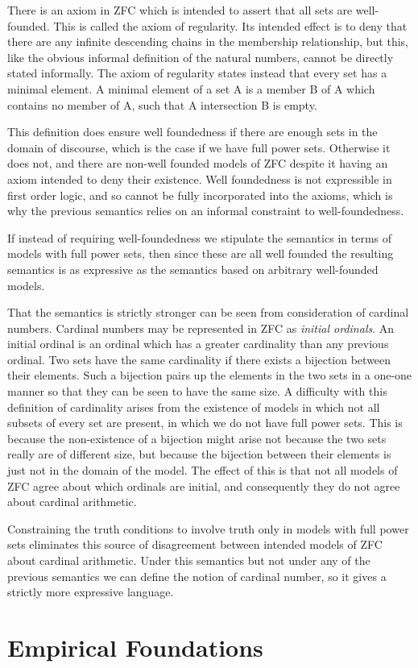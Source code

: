 There is an axiom in ZFC which is intended to assert that all sets are
well-founded.
This is called the axiom of regularity.
Its intended effect is to deny that there are any infinite descending
chains in the membership relationship, but this, like the obvious informal
definition of the natural numbers, cannot be directly stated
informally.
The axiom of regularity states instead that every set has a minimal
element.
A minimal element of a set A is a member B of A which contains no member of
A, such that A intersection B is empty.

This definition does ensure well foundedness if there are enough sets
in the domain of discourse, which is the case if we have full power
sets.
Otherwise it does not, and there are non-well founded models of ZFC
despite it having an axiom intended to deny their existence.
Well foundedness is not expressible in first order logic, and so
cannot be fully incorporated into the axioms, which is why the
previous semantics relies on an informal constraint to
well-foundedness.

If instead of requiring well-foundedness we stipulate the semantics in
terms of models with full power sets, then since these are all well
founded the resulting semantics is as expressive as the semantics
based on arbitrary well-founded models.

That the semantics is strictly stronger can be seen from consideration
of cardinal numbers.
Cardinal numbers may be represented in ZFC as \emph{initial ordinals}.
An initial ordinal is an ordinal which has a greater cardinality than
any previous ordinal.
Two sets have the same cardinality if there exists a bijection between
their elements.
Such a bijection pairs up the elements in the two sets in a one-one
manner so that they can be seen to have the same size.
A difficulty with this definition of cardinality arises from the
existence of models in which not all subsets of every set are
present, in which we do not have full power sets.
This is because the non-existence of a bijection might arise not
because the two sets really are of different size, but because the
bijection between their elements is just not in the domain of the
model.
The effect of this is that not all models of ZFC agree about which
ordinals are initial, and consequently they do not agree about
cardinal arithmetic.

Constraining the truth conditions to involve truth only in models with
full power sets eliminates this source of disagreement between
intended models of ZFC about cardinal arithmetic.
Under this semantics but not under any of the previous semantics we
can define the notion of cardinal number, so it gives a strictly more
expressive language.

\section{Empirical Foundations}

